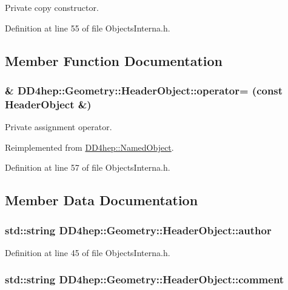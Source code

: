 Private copy constructor. 

Definition at line 55 of file ObjectsInterna.h.

\subsection{Member Function Documentation}
\hypertarget{class_d_d4hep_1_1_geometry_1_1_header_object_aa577cb624bf183b4ac62e22554f069f1}{
\subsubsection[{operator=}]{\& DD4hep::Geometry::HeaderObject::operator= (const {\bf HeaderObject} \&)}}
\label{class_d_d4hep_1_1_geometry_1_1_header_object_aa577cb624bf183b4ac62e22554f069f1}


Private assignment operator. 

Reimplemented from \hyperlink{class_d_d4hep_1_1_named_object_a474ed41e8d8b480401671dfe07b33eb6}{DD4hep::NamedObject}.

Definition at line 57 of file ObjectsInterna.h.

\subsection{Member Data Documentation}
\hypertarget{class_d_d4hep_1_1_geometry_1_1_header_object_a63216a220333f0c791f5dc9676e9c38d}{
\subsubsection[{author}]{\setlength{\rightskip}{0pt plus 5cm}std::string {\bf DD4hep::Geometry::HeaderObject::author}}}
\label{class_d_d4hep_1_1_geometry_1_1_header_object_a63216a220333f0c791f5dc9676e9c38d}


Definition at line 45 of file ObjectsInterna.h.\hypertarget{class_d_d4hep_1_1_geometry_1_1_header_object_aead0ebf0a1dcc61fbb5f30ca5113484f}{
\subsubsection[{comment}]{\setlength{\rightskip}{0pt plus 5cm}std::string {\bf DD4hep::Geometry::HeaderObject::comment}}}
\label{class_d_d4hep_1_1_geometry_1_1_header_object_aead0ebf0a1dcc61fbb5f30ca5113484f}


